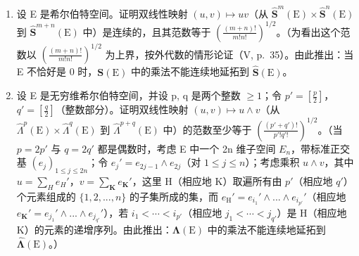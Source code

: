\begin{enumerate}
\def\labelenumi{\arabic{enumi})}
\tightlist
\item
  设 E 是希尔伯特空间。证明双线性映射 \((u, v) \mapsto uv\)（从 \(\hat{\mathbf{S}}^{m}(\mathrm{E}) \times \hat{\mathbf{S}}^{n}(\mathrm{E})\) 到 \(\hat{\mathbf{S}}^{m+n}(\mathrm{E})\) 中）是连续的，且其范数等于 \(\left(\frac{(m+n)!}{m! n!}\right)^{1/2}\)。（为看出这个范数以 \(\left(\frac{(m+n)!}{m! n!}\right)^{1/2}\) 为上界，按外代数的情形论证（V, p.~35）。由此推出：当 E 不恰好是 0 时，\(\mathbf{S}(\mathrm{E})\) 中的乘法不能连续地延拓到 \(\hat{\mathbf{S}}(\mathrm{E})\)。
\item
  设 E 是无穷维希尔伯特空间，并设 p, q 是两个整数 \(\geqslant 1\)；令 \(p' = \left[\frac{p}{2}\right]\)，\(q' = \left[\frac{q}{2}\right]\)（整数部分）。证明双线性映射 \((u, v) \mapsto u \wedge v\)（从 \(\hat{\Lambda}^{p}(\mathrm{E}) \times \hat{\Lambda}^{q}(\mathrm{E})\) 到 \(\hat{\Lambda}^{p+q}(\mathrm{E})\) 中）的范数至少等于 \(\left(\frac{(p' + q')!}{p'! q'!}\right)^{1/2}\)。（当 \(p = 2p'\) 与 \(q = 2q'\) 都是偶数时，考虑 E 中一个 2n 维子空间 \(E_{n}\)，带标准正交基 \((e_{j})_{1 \leqslant j \leqslant 2n}\)；令 \(e_{j}' = e_{2j-1} \wedge e_{2j}\)（对 \(1 \leqslant j \leqslant n\)）；考虑乘积 \(u \wedge v\)，其中 \(u = \sum_{H} e_{H}'\)，\(v = \sum_{\mathbf{K}} e_{\mathbf{K}}'\)，这里 H（相应地 K）取遍所有由 \(p'\)（相应地 \(q'\)）个元素组成的 \(\{1, 2, ..., n\}\) 的子集所成的集，而 \(e_{\mathrm{H}}' = e_{i_1}' \wedge ... \wedge e_{i_{p'}}'\)（相应地 \(e_{\mathbf{K}}' = e_{j_1}' \wedge ... \wedge e_{j_{q'}}'\)），若 \(i_1 < \cdots < i_{p'}\)（相应地 \(j_1 < \cdots < j_{q'}\)）是 H（相应地 K）的元素的递增序列。由此推出：\(\boldsymbol{\Lambda}(\mathrm{E})\) 中的乘法不能连续地延拓到 \(\hat{\boldsymbol{\Lambda}}(\mathrm{E})\)。）
\end{enumerate}
